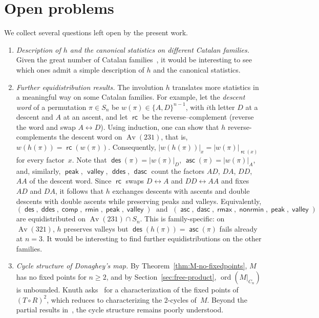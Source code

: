 \documentclass[a4paper,11pt]{article}
\theoremstyle{definition}
\DeclareMathOperator{\comp}{\mathsf{comp}}
\DeclareMathOperator{\peak}{\mathsf{peak}}
\DeclareMathOperator{\rmin}{\mathsf{rmin}}
\DeclareMathOperator{\nonrmin}{\mathsf{nonrmin}}
\DeclareMathOperator{\rmax}{\mathsf{rmax}}
\DeclareMathOperator{\Av}{Av}
\DeclareMathOperator{\des}{\mathsf{des}}
\DeclareMathOperator{\asc}{\mathsf{asc}}
\DeclareMathOperator{\ddes}{\mathsf{ddes}}
\DeclareMathOperator{\dasc}{\mathsf{dasc}}
\DeclareMathOperator{\valley}{\mathsf{valley}}
\newcommand{\rc}{\operatorname{\mathsf{rc}}}
\begin{document}
\section{Open problems}\label{sec:open}

We collect several questions left open by the present
work.

\begin{enumerate}
\item \emph{Description of $h$ and the canonical statistics on different Catalan
    families.} Given the great number of Catalan families~\cite{Stanley15}, it
  would be interesting to see which ones admit a simple description of $h$ and
  the canonical statistics.

\item \emph{Further equidistribution results.}  The involution $h$
  translates more statistics in a meaningful way on some Catalan families. For
  example, let the \emph{descent word} of a permutation $\pi \in S_n$ be
  $w(\pi) \in \{A, D\}^{n-1}$, with $i$th letter $D$ at a descent and $A$ at an
  ascent, and let $\rc$ be the reverse--complement (reverse the word and swap
  $A \leftrightarrow D$). Using induction, one can show that $h$
  reverse-complements the descent word on $\Av(231)$, that is,
  $w(h(\pi)) = \rc(w(\pi))$. Consequently,
  $|w(h(\pi))|_x = |w(\pi)|_{\rc(x)}$ for every factor~$x$. Note that
  $\des(\pi) = |w(\pi)|_D$, $\asc(\pi) = |w(\pi)|_A$, and, similarly, $\peak$,
  $\valley$, $\ddes$, $\dasc$ count the factors $AD$, $DA$, $DD$, $AA$ of the
  descent word. Since
  $\rc$ swaps $D \leftrightarrow A$ and $DD \leftrightarrow AA$ and fixes $AD$
  and $DA$, it follows that $h$ exchanges descents with ascents
  and double descents with double ascents while preserving peaks and valleys.
  Equivalently,
  \[
    (\des, \ddes, \comp, \rmin, \peak, \valley)
    \;\text{ and }\;
    (\asc, \dasc, \rmax, \nonrmin, \peak, \valley)
  \]
  are equidistributed on $\Av(231) \cap S_n$. This is family-specific:
  on $\Av(321)$, $h$ preserves valleys but $\des(h(\pi)) = \asc(\pi)$
  fails already at $n = 3$. It would be interesting to find further
  equidistributions on the other families.

\item \emph{Cycle structure of Donaghey's map.}  By
  Theorem~\ref{thm:M-no-fixedpoints}, $M$ has no fixed points for $n \geq 2$,
  and by Section~\ref{sec:free-product}, $\operatorname{ord}(M|_{C_n})$ is unbounded.
  Knuth asks~\cite[Ex.~17, \S7.2.1.6]{Knuth06} for a characterization of the
  fixed points of $(T \circ R)^2$, which reduces to characterizing the
  $2$-cycles of~$M$.  Beyond the partial results
  in~\cite{PushkarevByzov14,PushkarevByzov19,Shapiro79}, the cycle structure
  remains poorly understood.


\end{enumerate}
\end{document}
